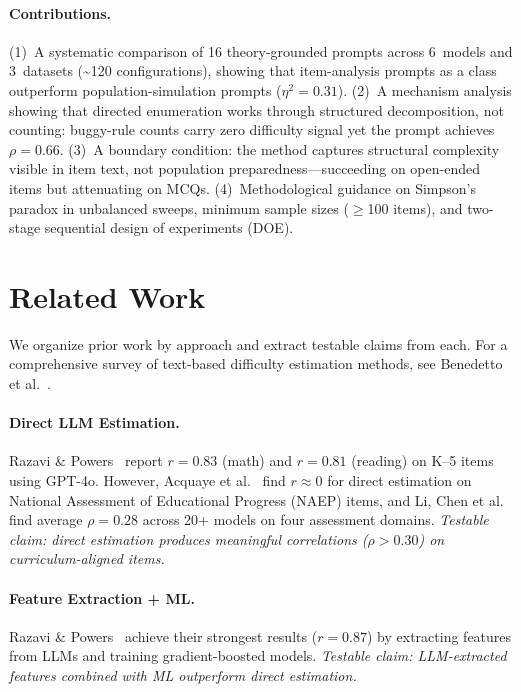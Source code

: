 \documentclass[runningheads]{llncs}
\begin{document}
\paragraph{Contributions.}
(1)~A systematic comparison of 16 theory-grounded prompts across 6~models and 3~datasets (\textasciitilde120 configurations), showing that item-analysis prompts as a class outperform population-simulation prompts ($\eta^2 = 0.31$).
(2)~A mechanism analysis showing that directed enumeration works through structured decomposition, not counting: buggy-rule counts carry zero difficulty signal yet the prompt achieves $\rho = 0.66$.
(3)~A boundary condition: the method captures structural complexity visible in item text, not population preparedness---succeeding on open-ended items but attenuating on MCQs.
(4)~Methodological guidance on Simpson's paradox in unbalanced sweeps, minimum sample sizes ($\ge$100 items), and two-stage sequential design of experiments (DOE).

\section{Related Work}

We organize prior work by approach and extract testable claims from each. For a comprehensive survey of text-based difficulty estimation methods, see Benedetto et al.~\cite{benedetto2023}.

\paragraph{Direct LLM Estimation.}
Razavi \& Powers~\cite{razavi2025} report $r=0.83$ (math) and $r=0.81$ (reading) on K--5 items using GPT-4o. However, Acquaye et al.~\cite{acquaye2025} find $r\approx0$ for direct estimation on National Assessment of Educational Progress (NAEP) items, and Li, Chen et al.~\cite{lichen2025} find average $\rho=0.28$ across 20+ models on four assessment domains. \emph{Testable claim: direct estimation produces meaningful correlations ($\rho>0.30$) on curriculum-aligned items.}

\paragraph{Feature Extraction + ML.}
Razavi \& Powers~\cite{razavi2025} achieve their strongest results ($r=0.87$) by extracting features from LLMs and training gradient-boosted models. \emph{Testable claim: LLM-extracted features combined with ML outperform direct estimation.}
\end{document}
